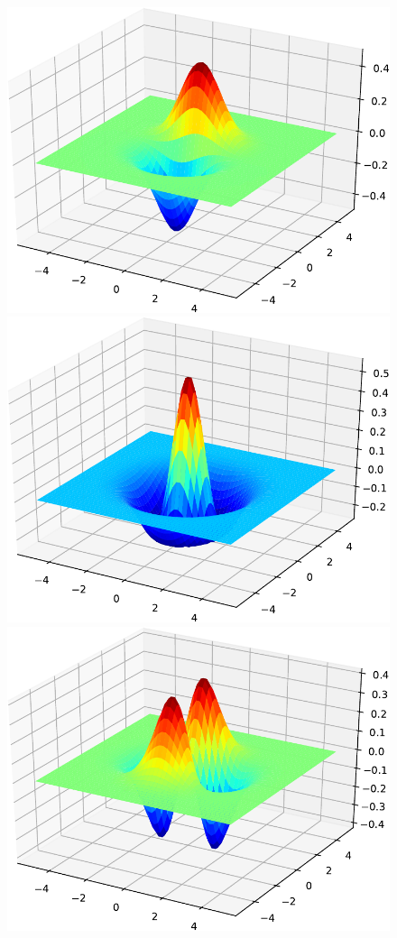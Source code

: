 \begin{figure}[H]
{\includegraphics[scale=0.3]{../codes/sch_2d/IMG_harmonic_psi_3.pdf}\\
\includegraphics[scale=0.3]{../codes/sch_2d/IMG_harmonic_psi_4.pdf}%
\includegraphics[scale=0.3]{../codes/sch_2d/IMG_harmonic_psi_5.pdf}%
}
\end{figure}
